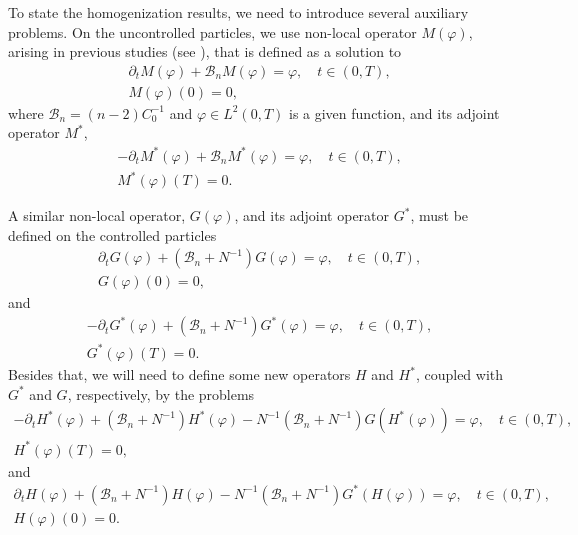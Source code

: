 \documentclass[10pt,a4paper]{amsart}
\numberwithin{equation}{section}
\begin{document}
To state the homogenization results, we need to introduce several auxiliary
problems. On the uncontrolled particles, we use non-local operator
$M(\varphi )$, arising in previous studies (see \cite{DiPoShAttouch}), that
is defined as a solution to
\begin{equation}
\begin{gathered}
\partial _{t}M(\varphi )+\mathcal{B}_nM(\varphi )=\varphi , \quad t\in (0,T), \\
M(\varphi )(0)=0,
\end{gathered}
\end{equation}
where $\mathcal{B}_n=(n-2)C_0^{-1}$ and $\varphi \in L^2(0,T)$ is a
given function, and its adjoint operator $M^{\ast }$,
\begin{equation}
\begin{gathered}
-\partial _{t}M^{\ast }(\varphi )+\mathcal{B}_nM^{\ast }(\varphi )
=\varphi, \quad t\in (0,T), \\
M^{\ast }(\varphi )(T)=0.
\end{gathered}
\end{equation}

A similar non-local operator, $G(\varphi )$, and its adjoint operator
$G^{\ast }$, must be defined on the controlled particles
\begin{equation}
\begin{gathered}
\partial _{t}G(\varphi )+(\mathcal{B}_n+N^{-1})G(\varphi )=\varphi , \quad
t\in (0,T), \\
G(\varphi )(0)=0,
\end{gathered}  \label{G prob}
\end{equation}
and
\begin{equation}
\begin{gathered}
-\partial _{t}G^{\ast }(\varphi )+(\mathcal{B}_n+N^{-1})G^{\ast }(\varphi
)=\varphi , \quad t\in (0,T), \\
G^{\ast }(\varphi )(T)=0. 
\end{gathered}  \label{adj G prob}
\end{equation}
Besides that, we will need to define some new operators $H$ and $H^{\ast }$,
coupled with $G^{\ast }$ and $G$, respectively, by the problems
\begin{equation}
\begin{gathered}
-\partial _{t}H^{\ast }(\varphi )+(\mathcal{B}_n+N^{-1})H^{\ast }(\varphi
)-N^{-1}(\mathcal{B}_n+N^{-1})G(H^{\ast }(\varphi ))=\varphi , \quad
 t\in (0,T), \\
H^{\ast }(\varphi )(T)=0, 
\end{gathered} \label{H*eq}
\end{equation}
and
\begin{equation}
\begin{gathered}
\partial _{t}H(\varphi )+(\mathcal{B}_n+N^{-1})H(\varphi )
-N^{-1}(\mathcal{B}_n+N^{-1})G^{\ast }(H(\varphi ))=\varphi , \quad t\in (0,T), \\
H(\varphi )(0)=0. 
\end{gathered}  \label{eqH}
\end{equation}
\end{document}
